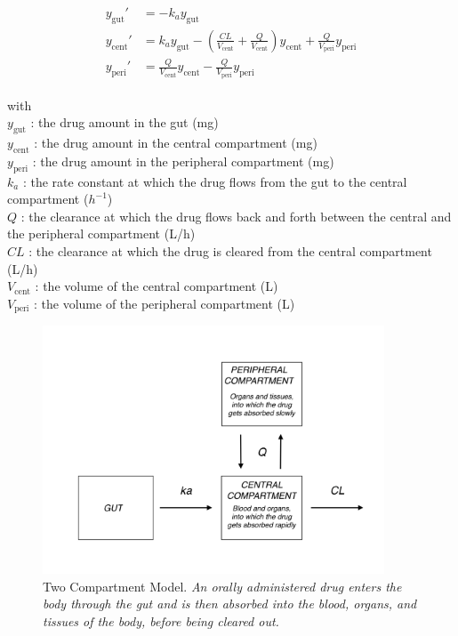 \documentclass[11pt]{amsart}
\begin{document}
\begin{eqnarray}
  \begin{aligned}
  y_\mathrm{gut}' &= -k_a y_\mathrm{gut} \\
  y_\mathrm{cent}' &= k_a y_\mathrm{gut} - \left(\frac{CL}{V_\mathrm{cent}} + \frac{Q}{V_\mathrm{cent}} \right) y_\mathrm{cent} +  \frac{Q}{V_\mathrm{peri}} y_\mathrm{peri} \\
  y_\mathrm{peri}' &= \frac{Q}{V_\mathrm{cent}} y_\mathrm{cent} - \frac{Q}{V_\mathrm{peri}} y_\mathrm{peri}
  \end{aligned}
  \label{eq:2Cpt}
\end{eqnarray}

with \\  
$y_\mathrm{gut}$ : the drug amount in the gut (mg)  \\
$y_\mathrm{cent}$ : the drug amount in the central compartment (mg)  \\
$y_\mathrm{peri}$ : the drug amount in the peripheral compartment (mg)  \\
$k_a$ : the rate constant at which the drug flows from the gut to the central compartment ($h^{-1}$)  \\
$Q$ : the clearance at which the drug flows back and forth between the central and the peripheral compartment (L/h) \\ 
$CL$ : the clearance at which the drug is cleared from the central compartment (L/h)  \\
$V_\mathrm{cent}$ : the volume of the central compartment (L)  \\
$V_\mathrm{peri}$ : the volume of the peripheral compartment (L) \\

\begin{figure}[!htb]
\begin{center}
\includegraphics[width=4in,trim=0in 0in 0 0in]{graphics/TwoCptNice.png}
\caption{{Two Compartment Model. \textit{An orally administered drug enters the body through
the gut and is then absorbed into the blood, organs, and tissues of the body, before being cleared out.}}}
\label{TwoCptNice}
\end{center}
\end{figure}
\end{document}
